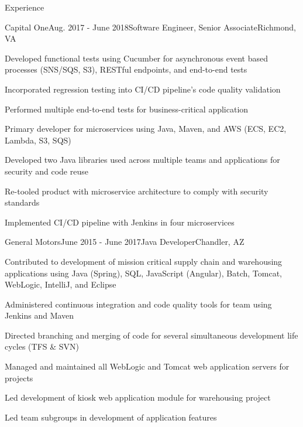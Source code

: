 \documentclass{resume} %
\begin{document}
\begin{rSection}{Experience}
\begin{rSubsection}{Capital One}{Aug. 2017 - June 2018}{Software Engineer, Senior Associate}{Richmond, VA}
	\vspace{-0.5em}\setlength{\itemindent}{.0in}\item{
		Developed functional tests using Cucumber for asynchronous event based processes (SNS/SQS, S3), RESTful endpoints, and end-to-end tests
	}
	\setlength{\itemindent}{.0in}\item{
		Incorporated regression testing into CI/CD pipeline's code quality validation
	}
	\setlength{\itemindent}{.0in}\item{
		Performed multiple end-to-end tests for business-critical application
	}
	\setlength{\itemindent}{.0in}\item{ 
		Primary developer for microservices using Java, Maven, and AWS (ECS, EC2, Lambda, S3, SQS)
	}
	\setlength{\itemindent}{.0in}\item{
		Developed two Java libraries used across multiple teams and applications for security and code reuse
	}
	\setlength{\itemindent}{.0in}\item{
		Re-tooled product with microservice architecture to comply with security standards
	}
	\setlength{\itemindent}{.0in}\item{
		Implemented CI/CD pipeline with Jenkins in four microservices
	}

\end{rSubsection}

\begin{rSubsection}{General Motors}{June 2015 - June 2017}{Java Developer}{Chandler, AZ}
	\vspace{-0.5em}\setlength{\itemindent}{.0in}\item {
		Contributed to development of mission critical supply chain and warehousing applications using
		\newline
		Java (Spring), SQL, JavaScript (Angular), Batch, Tomcat, WebLogic, IntelliJ, and Eclipse
	}
	\setlength{\itemindent}{.0in}\item{
		Administered continuous integration and code quality tools for team using Jenkins and Maven
	}
	\setlength{\itemindent}{.0in}\item{
		Directed branching and merging of code for several simultaneous development life cycles (TFS \& SVN)
	}
	\setlength{\itemindent}{.0in}\item{
		Managed and maintained all WebLogic and Tomcat web application servers for projects
	}
	\setlength{\itemindent}{.0in}\item{
		Led development of kiosk web application module for warehousing project
	}
	\setlength{\itemindent}{.0in}\item{
		Led team subgroups in development of application features
	}


\end{rSubsection}
\end{rSection}
\end{document}
